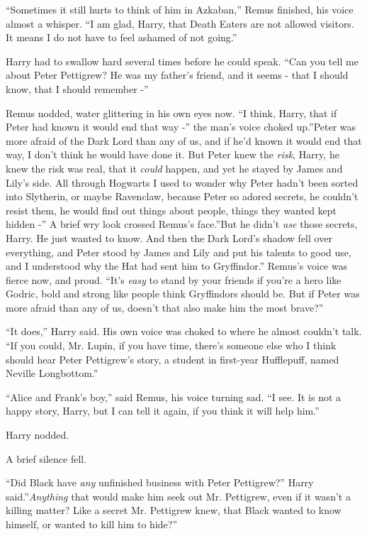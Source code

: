 ``Sometimes it still hurts to think of him in Azkaban,'' Remus finished,
his voice almost a whisper. ``I am glad, Harry, that Death Eaters are
not allowed visitors. It means I do not have to feel ashamed of not
going.''

Harry had to swallow hard several times before he could speak. ``Can you
tell me about Peter Pettigrew? He was my father's friend, and it seems -
that I should know, that I should remember -''

Remus nodded, water glittering in his own eyes now. ``I think, Harry,
that if Peter had known it would end that way -'' the man's voice choked
up.''Peter was more afraid of the Dark Lord than any of us, and if he'd
known it would end that way, I don't think he would have done it. But
Peter knew the \emph{risk}, Harry, he knew the risk was real, that it
\emph{could} happen, and yet he stayed by James and Lily's side. All
through Hogwarts I used to wonder why Peter hadn't been sorted into
Slytherin, or maybe Ravenclaw, because Peter so adored secrets, he
couldn't resist them, he would find out things about people, things they
wanted kept hidden -'' A brief wry look crossed Remus's face.''But he
didn't \emph{use} those secrets, Harry. He just wanted to know. And then
the Dark Lord's shadow fell over everything, and Peter stood by James
and Lily and put his talents to good use, and I understood why the Hat
had sent him to Gryffindor.'' Remus's voice was fierce now, and proud.
``It's \emph{easy} to stand by your friends if you're a hero like Godric,
bold and strong like people think Gryffindors should be. But if Peter
was more afraid than any of us, doesn't that also make him the most
brave?''

``It does,'' Harry said. His own voice was choked to where he almost
couldn't talk. ``If you could, Mr. Lupin, if you have time, there's
someone else who I think should hear Peter Pettigrew's story, a student
in first-year Hufflepuff, named Neville Longbottom.''

``Alice and Frank's boy,'' said Remus, his voice turning sad. ``I see.
It is not a happy story, Harry, but I can tell it again, if you think it
will help him.''

Harry nodded.

A brief silence fell.

``Did Black have \emph{any} unfinished business with Peter Pettigrew?''
Harry said.''\emph{Anything} that would make him seek out Mr. Pettigrew,
even if it wasn't a killing matter? Like a secret Mr. Pettigrew knew,
that Black wanted to know himself, or wanted to kill him to hide?''

